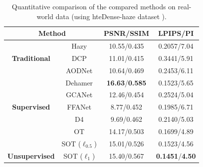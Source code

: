\documentclass[10pt,journal,compsoc]{IEEEtran}
\begin{document}
\begin{table}[!t]
	\renewcommand\arraystretch{2}
	\footnotesize
	\centering
	\caption{Quantitative comparison of the compared methods on real-world data (using hteDense-haze dataset \cite{dense}).}
        \begin{tabular}{|cc|c|c|}
		\hline
		\multicolumn{2}{|c|}{\textbf{Method}}                           					 & \textbf{PSNR/SSIM}       & \textbf{LPIPS/PI} \\ \hline
		\multicolumn{1}{|c|}{\textbf{}}                        & Hazy                           & 10.55/0.435                        & 0.2057/7.04                         \\ \hline
		\multicolumn{1}{|c|}{\textbf{Traditional}}                    & DCP\cite{he2010single}                            & 11.01/0.415                        & 0.3441/5.91
                                         \\ \hline
		\multicolumn{1}{|c|}{}                                 & AODNet\cite{aodnet}                         & 10.64/0.469                        & 0.2453/6.11                                         \\ \cline{2-4} 
		\multicolumn{1}{|c|}{}                                 & Dehamer\cite{dehamer}                        & \textbf{16.63}/\textbf{0.585}                       & 0.1523/5.65                                         \\ \cline{2-4} 
		\multicolumn{1}{|c|}{}                                 & GCANet\cite{gcanet}                         & 12.46/0.454                        & 0.2524/5.04                                         \\ \cline{2-4} 
		\multicolumn{1}{|c|}{\multirow{-4}{*}{\textbf{Supervised}}}  & FFANet\cite{ffanet}                         & 8.77/0.452                       & 0.1985/6.71                                         \\ \hline
		\multicolumn{1}{|c|}{}                                 & D4\cite{d4}                            & 9.69/0.462                        & 0.2140/5.03                                        \\ \cline{2-4} 
		\multicolumn{1}{|c|}{}                                 & OT\cite{wang2022optimal}                        & 14.17/0.503                        & 0.1699/4.89                                         \\ \cline{2-4} 
		\multicolumn{1}{|c|}{}                                 & SOT ($\ell_{0.5}$)                        & 15.01/0.526                       & 0.1523/4.56                                         \\ \cline{2-4} 
		\multicolumn{1}{|c|}{\multirow{-4}{*}{\textbf{Unsupervised}}} & SOT ($\ell_{1}$)				    & 15.40/0.567						& \textbf{0.1451}/\textbf{4.50}               						\\ \hline
	\end{tabular}
\end{table}
\end{document}
